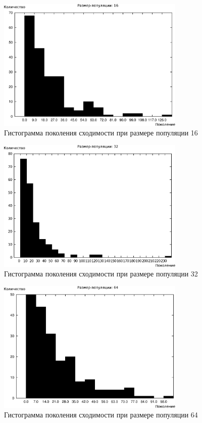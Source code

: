 \begin{figure}[h!]
\centering
\includegraphics[width=0.8\textwidth]{science/histogram16}
\caption{Гистограмма поколения сходимости при размере популяции 16}
\label{figure:histogram16}
\end{figure}

\begin{figure}[h!]
\centering
\includegraphics[width=0.8\textwidth]{science/histogram32}
\caption{Гистограмма поколения сходимости при размере популяции 32}
\label{figure:histogram32}
\end{figure}

\begin{figure}[h!]
\centering
\includegraphics[width=0.8\textwidth]{science/histogram64}
\caption{Гистограмма поколения сходимости при размере популяции 64}
\label{figure:histogram64}
\end{figure}

